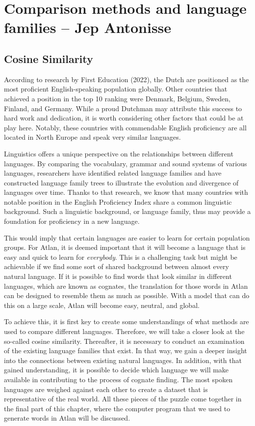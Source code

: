 \section{Comparison methods and language families -- {\small Jep Antonisse}}

\subsection{Cosine Similarity}

According to research by First Education (2022), the Dutch are positioned as the most proficient English-speaking population globally. Other countries that achieved a position in the top 10 ranking were Denmark, Belgium, Sweden, Finland, and Germany. While a proud Dutchman may attribute this success to hard work and dedication, it is worth considering other factors that could be at play here. Notably, these countries with commendable English proficiency are all located in North Europe and speak very similar languages.  

Linguistics offers a unique perspective on the relationships between different languages. By comparing the vocabulary, grammar and sound systems of various languages, researchers have identified related language families and have constructed language family trees to illustrate the evolution and divergence of languages over time. Thanks to that research, we know that many countries with notable position in the English Proficiency Index share a common linguistic background. Such a linguistic background, or language family, thus may provide a foundation for proficiency in a new language. 

This would imply that certain languages are easier to learn for certain population groups. For Atlan, it is deemed important that it will become a language that is easy and quick to learn for \textit{everybody}. This is a challenging task but might be achievable if we find some sort of shared background between almost every natural language. If it is possible to find words that look similar in different languages, which are known as cognates, the translation for those words in Atlan can be designed to resemble them as much as possible. With a model that can do this on a large scale, Atlan will become easy, neutral, and global.  

To achieve this, it is first key to create some understandings of what methods are used to compare different languages. Therefore, we will take a closer look at the so-called cosine similarity. Thereafter, it is necessary to conduct an examination of the existing language families that exist. In that way, we gain a deeper insight into the connections between existing natural languages. In addition, with that gained understanding, it is possible to decide which language we will make available in contributing to the process of cognate finding. The most spoken languages are weighed against each other to create a dataset that is representative of the real world. All these pieces of the puzzle come together in the final part of this chapter, where the computer program that we used to generate words in Atlan will be discussed.
\vspace{0.3cm}

